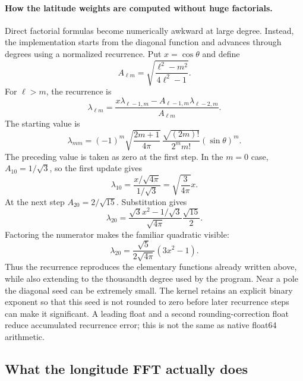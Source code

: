\documentclass[11pt]{article}
\begin{document}
\paragraph{How the latitude weights are computed without huge factorials.}
Direct factorial formulas become numerically awkward at large degree.
Instead, the implementation starts from the diagonal function and advances
through degrees using a normalized recurrence. Put $x=\cos\theta$ and define
\begin{equation}
 A_{\ell m}=\sqrt{\frac{\ell^2-m^2}{4\ell^2-1}}.
\end{equation}
For $\ell>m$, the recurrence is
\begin{equation}
 \lambda_{\ell m}
 =\frac{x\lambda_{\ell-1,m}-A_{\ell-1,m}\lambda_{\ell-2,m}}
 {A_{\ell m}}.
\end{equation}
The starting value is
\begin{equation}
 \lambda_{mm}=(-1)^m
 \sqrt{\frac{2m+1}{4\pi}}\,
 \frac{\sqrt{(2m)!}}{2^m m!}(\sin\theta)^m.
\end{equation}
The preceding value is taken as zero at the first step. In the $m=0$
case, $A_{10}=1/\sqrt{3}$, so the first update gives
\begin{equation}
 \lambda_{10}=\frac{x/\sqrt{4\pi}}{1/\sqrt{3}}
              =\sqrt{\frac{3}{4\pi}}x.
\end{equation}
At the next step $A_{20}=2/\sqrt{15}$. Substitution gives
\begin{equation}
 \lambda_{20}=\frac{\sqrt{3}x^2-1/\sqrt{3}}
 {\sqrt{4\pi}}\frac{\sqrt{15}}{2}.
\end{equation}
Factoring the numerator makes the familiar quadratic visible:
\begin{equation}
 \lambda_{20}=\frac{\sqrt{5}}{2\sqrt{4\pi}}(3x^2-1).
\end{equation}
Thus the recurrence reproduces the elementary functions already written
above, while also extending to the thousandth degree used by the program.
Near a pole the diagonal seed can be extremely small. The kernel retains
an explicit binary exponent so that this seed is not rounded to zero
before later recurrence steps can make it significant. A leading float
and a second rounding-correction float reduce accumulated recurrence
error; this is not the same as native float64 arithmetic.

\subsection{What the longitude FFT actually does}
\end{document}
